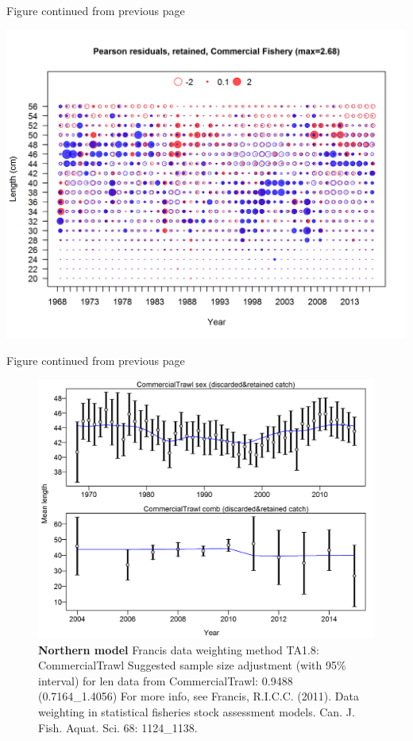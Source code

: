 \documentclass[12pt,]{article}
\begin{document}
\begin{center} 

            Figure continued from previous page 

            \end{center}

\includegraphics{./r4ss/plots_mod1/comp_lenfit_residsflt1mkt2_page2.png}

\begin{center} 

            Figure continued from previous page 

            \end{center}

\begin{figure}[htbp]
\centering
\includegraphics{./r4ss/plots_mod1/comp_lenfit_data_weighting_TA1.8_CommercialTrawl.png}
\caption{\textbf{Northern model} Francis data weighting method TA1.8:
CommercialTrawl Suggested sample size adjustment (with 95\% interval)
for len data from CommercialTrawl: 0.9488 (0.7164\_1.4056) For more
info, see Francis, R.I.C.C. (2011). Data weighting in statistical
fisheries stock assessment models. Can. J. Fish. Aquat. Sci. 68:
1124\_1138.
\label{fig:mod1_5_comp_lenfit_data_weighting_TA1.8_CommercialTrawl}}
\end{figure}
\end{document}
